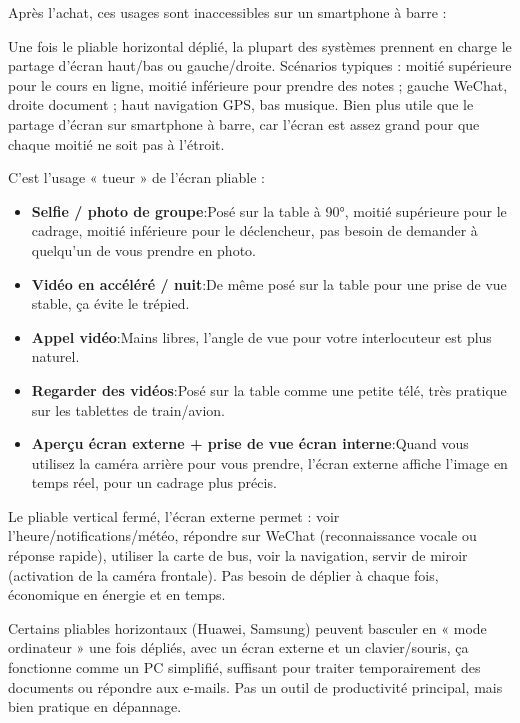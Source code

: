 
Après l'achat, ces usages sont inaccessibles sur un smartphone à barre :


Une fois le pliable horizontal déplié, la plupart des systèmes prennent en charge le partage d'écran haut/bas ou gauche/droite. Scénarios typiques : moitié supérieure pour le cours en ligne, moitié inférieure pour prendre des notes ; gauche WeChat, droite document ; haut navigation GPS, bas musique. Bien plus utile que le partage d'écran sur smartphone à barre, car l'écran est assez grand pour que chaque moitié ne soit pas à l'étroit.


C'est l'usage « tueur » de l'écran pliable :

\begin{itemize}
  \item \textbf{Selfie / photo de groupe}:Posé sur la table à 90°, moitié supérieure pour le cadrage, moitié inférieure pour le déclencheur, pas besoin de demander à quelqu’un de vous prendre en photo.
  \item \textbf{Vidéo en accéléré / nuit}:De même posé sur la table pour une prise de vue stable, ça évite le trépied.
  \item \textbf{Appel vidéo}:Mains libres, l’angle de vue pour votre interlocuteur est plus naturel.
  \item \textbf{Regarder des vidéos}:Posé sur la table comme une petite télé, très pratique sur les tablettes de train/avion.
  \item \textbf{Aperçu écran externe + prise de vue écran interne}:Quand vous utilisez la caméra arrière pour vous prendre, l’écran externe affiche l’image en temps réel, pour un cadrage plus précis.
\end{itemize}


Le pliable vertical fermé, l'écran externe permet : voir l'heure/notifications/météo, répondre sur WeChat (reconnaissance vocale ou réponse rapide), utiliser la carte de bus, voir la navigation, servir de miroir (activation de la caméra frontale). Pas besoin de déplier à chaque fois, économique en énergie et en temps.


Certains pliables horizontaux (Huawei, Samsung) peuvent basculer en « mode ordinateur » une fois dépliés, avec un écran externe et un clavier/souris, ça fonctionne comme un PC simplifié, suffisant pour traiter temporairement des documents ou répondre aux e-mails. Pas un outil de productivité principal, mais bien pratique en dépannage.

